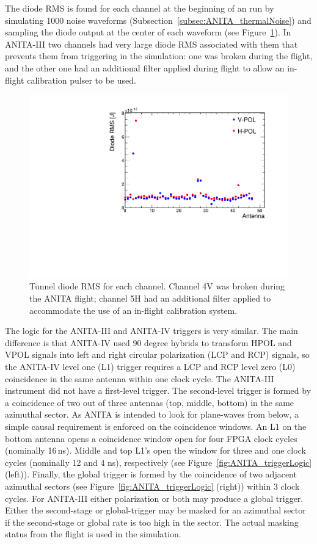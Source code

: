 The diode RMS is found for each channel at the beginning of an \icemc
run by simulating 1000 noise waveforms
(Subsection~\ref{subsec:ANITA_thermalNoise}) 
and sampling the diode output at the center of each waveform
(see Figure~\ref{fig:ANITA_diodeRMS}).
In ANITA-III two channels had very large diode RMS associated with them that prevents them from triggering in the simulation: one was broken during the flight, and the other one had an additional filter applied during flight to
allow an in-flight calibration pulser to be used.

\begin{figure}[!h]\centering
  \includegraphics[width=.45\linewidth]{./Figs/DiodeRMSfromFile.pdf}
  \caption{Tunnel diode RMS for each channel. Channel 4V was broken during the ANITA flight; channel 5H had an additional filter applied to accommodate the use of an in-flight calibration system.}
  \label{fig:ANITA_diodeRMS}
\end{figure}
 
The logic for the ANITA-III and ANITA-IV triggers is very similar.
The main difference is that ANITA-IV used 90 degree hybrids to transform HPOL and VPOL signals into left and right circular polarization (LCP and RCP) signals, so the ANITA-IV level one (L1) trigger requires a LCP and RCP level zero (L0) coincidence in the same antenna within one clock cycle.
The ANITA-III instrument did not have a first-level trigger.
The second-level trigger is formed by a coincidence of two out of three
antennas (top, middle, bottom) in the same azimuthal
sector. As ANITA is intended to look for plane-waves from below, a simple
causal requirement is enforced on the coincidence windows.  An L1 on the bottom
antenna opens a coincidence window open for four FPGA clock cycles (nominally 16\,ns).
Middle and top L1's open the window for three and one clock cycles (nominally 12 and 4
ns), respectively (see
Figure~\ref{fig:ANITA_triggerLogic} (left)).  
Finally, the global trigger is formed by the coincidence of
two adjacent azimuthal sectors (see Figure~\ref{fig:ANITA_triggerLogic} (right)) within 3 clock cycles.
For ANITA-III either polarization or both may produce a global trigger. 
Either the second-stage or global-trigger may be masked for an
azimuthal sector if the second-stage or global rate is too high in the sector.
The actual masking status from the flight is used in the simulation.


